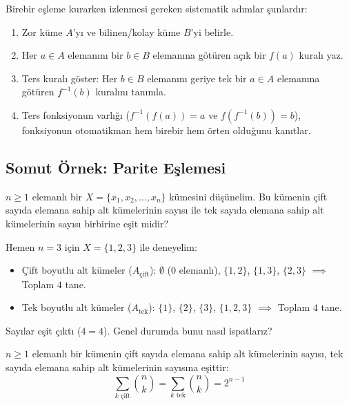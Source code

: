 Birebir eşleme kurarken izlenmesi gereken sistematik adımlar şunlardır:
\begin{enumerate}
    \item Zor küme $A$'yı ve bilinen/kolay küme $B$'yi belirle.
    \item Her $a \in A$ elemanını bir $b \in B$ elemanına götüren açık bir $f(a)$ kuralı yaz.
    \item Ters kuralı göster: Her $b \in B$ elemanını geriye tek bir $a \in A$ elemanına götüren $f^{-1}(b)$ kuralını tanımla.
    \item Ters fonksiyonun varlığı ($f^{-1}(f(a)) = a$ ve $f(f^{-1}(b)) = b$), fonksiyonun otomatikman hem birebir hem örten olduğunu kanıtlar.
\end{enumerate}

\subsection{Somut Örnek: Parite Eşlemesi}

$n \ge 1$ elemanlı bir $X = \{x_1, x_2, \dots, x_n\}$ kümesini düşünelim. Bu kümenin çift sayıda elemana sahip alt kümelerinin sayısı ile tek sayıda elemana sahip alt kümelerinin sayısı birbirine eşit midir?

Hemen $n = 3$ için $X = \{1, 2, 3\}$ ile deneyelim:
\begin{itemize}
    \item Çift boyutlu alt kümeler ($A_{\text{çift}}$): $\emptyset$ (0 elemanlı), $\{1, 2\}$, $\{1, 3\}$, $\{2, 3\}$ $\implies$ Toplam $4$ tane.
    \item Tek boyutlu alt kümeler ($A_{\text{tek}}$): $\{1\}$, $\{2\}$, $\{3\}$, $\{1, 2, 3\}$ $\implies$ Toplam $4$ tane.
\end{itemize}
Sayılar eşit çıktı ($4 = 4$). Genel durumda bunu nasıl ispatlarız?

\begin{theorem}
$n \ge 1$ elemanlı bir kümenin çift sayıda elemana sahip alt kümelerinin sayısı, tek sayıda elemana sahip alt kümelerinin sayısına eşittir:
\[ \sum_{k \text{ çift}} \binom{n}{k} = \sum_{k \text{ tek}} \binom{n}{k} = 2^{n-1} \]
\end{theorem}


